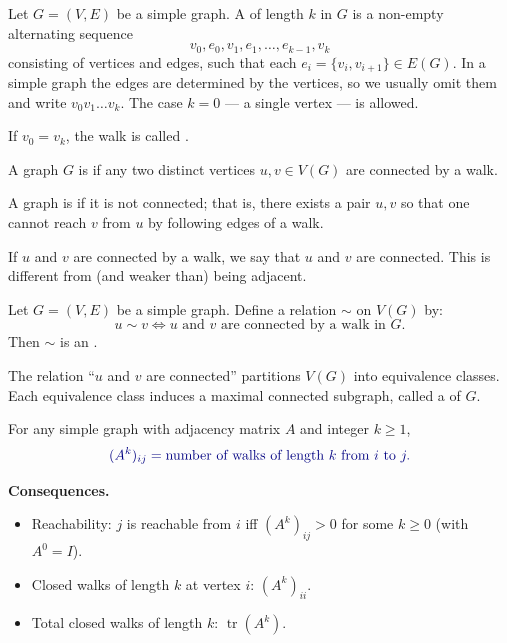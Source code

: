 \documentclass[8pt,a4paper,landscape]{extarticle}
\begin{document}
\begin{cscolumns}
\begin{definition}[Walk]
Let $G=(V,E)$ be a simple graph. A  of length $k$ in $G$ is a non-empty alternating sequence
\[ v_0,e_0,v_1,e_1,\dots,e_{k-1},v_k \]
consisting of vertices and edges, such that each $e_i=\{v_i,v_{i+1}\}\in E(G)$.
In a simple graph the edges are determined by the vertices, so we usually omit them and write $v_0v_1\dots v_k$. The case $k=0$ --- a single vertex --- is allowed.

If $v_0=v_k$, the walk is called .
\end{definition}

\begin{definition}
A graph $G$ is  if any two distinct vertices $u,v\in V(G)$ are connected by a walk.

A graph is  if it is not connected; that is, there exists a pair $u,v$ so that one cannot reach $v$ from $u$ by following edges of a walk.

If $u$ and $v$ are connected by a walk, we say that $u$ and $v$ are connected. This is different from (and weaker than) being adjacent.
\end{definition}

\begin{theorem}[Lemma]
Let $G=(V,E)$ be a simple graph. Define a relation $\sim$ on $V(G)$ by:
\[ u\sim v\iff u\text{ and }v\text{ are connected by a walk in }G. \]
Then $\sim$ is an .
\end{theorem}

\begin{definition}
The relation ``$u$ and $v$ are connected'' partitions $V(G)$ into equivalence classes.
Each equivalence class induces a maximal connected subgraph, called a  of $G$.
\end{definition}

\begin{theorem}
For any simple graph with adjacency matrix $A$ and integer $k\ge 1$,
\[ {\color{csBlue}(A^k)_{ij}=\text{number of walks of length }k\text{ from }i\text{ to }j.} \]
\end{theorem}
\textbf{Consequences.}
\begin{itemize}
\item Reachability: $j$ is reachable from $i$ iff $(A^k)_{ij}>0$ for some $k\ge 0$ (with $A^0=I$).
\item Closed walks of length $k$ at vertex $i$: $(A^k)_{ii}$.
\item Total closed walks of length $k$: $\operatorname{tr}(A^k)$.
\end{itemize}


\end{cscolumns}
\end{document}
